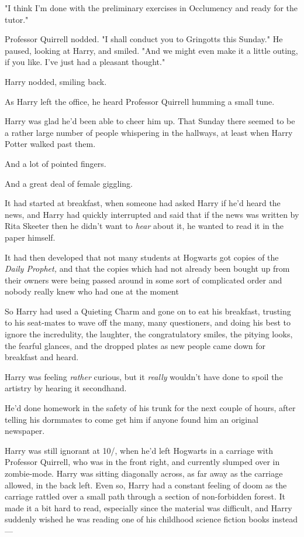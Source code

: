"I think I'm done with the preliminary exercises in Occlumency and ready for
the tutor."

Professor Quirrell nodded. "I shall conduct you to Gringotts this Sunday." He
paused, looking at Harry, and smiled. "And we might even make it a little
outing, if you like. I've just had a pleasant thought."

Harry nodded, smiling back.

As Harry left the office, he heard Professor Quirrell humming a small tune.

Harry was glad he'd been able to cheer him up.
\sbreak
That Sunday there seemed to be a rather large number of people whispering in
the hallways, at least when Harry Potter walked past them.

And a lot of pointed fingers.

And a great deal of female giggling.

It had started at breakfast, when someone had asked Harry if he'd heard the
news, and Harry had quickly interrupted and said that if the news was written
by Rita Skeeter then he didn't want to \emph{hear} about it, he wanted to read
it in the paper himself.

It had then developed that not many students at Hogwarts got copies of the
\emph{Daily Prophet,} and that the copies which had not already been bought up
from their owners were being passed around in some sort of complicated order
and nobody really knew who had one at the moment{\el}

So Harry had used a Quieting Charm and gone on to eat his breakfast, trusting
to his seat-mates to wave off the many, many questioners, and doing his best to
ignore the incredulity, the laughter, the congratulatory smiles, the pitying
looks, the fearful glances, and the dropped plates as new people came down for
breakfast and heard.

Harry was feeling \emph{rather} curious, but it \emph{really} wouldn't have
done to spoil the artistry by hearing it secondhand.

He'd done homework in the safety of his trunk for the next couple of hours,
after telling his dormmates to come get him if anyone found him an original
newspaper.

Harry was still ignorant at 10\AM/, when he'd left Hogwarts in a carriage with
Professor Quirrell, who was in the front right, and currently slumped over in
zombie-mode. Harry was sitting diagonally across, as far away as the carriage
allowed, in the back left. Even so, Harry had a constant feeling of doom as the
carriage rattled over a small path through a section of non-forbidden forest.
It made it a bit hard to read, especially since the material was difficult, and
Harry suddenly wished he was reading one of his childhood science fiction books
instead---

